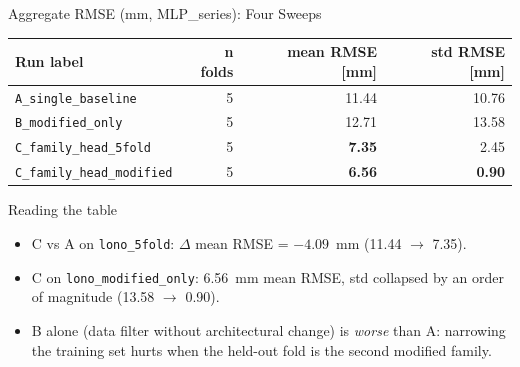 \documentclass[UTF8,aspectratio=169]{ctexbeamer}
\newcommand{\good}[1]{\textcolor{green!45!black}{#1}}
\begin{document}
\begin{frame}{Aggregate RMSE (mm, MLP\_series): Four Sweeps}
\small
\begin{center}
\renewcommand{\arraystretch}{1.22}
\setlength{\tabcolsep}{6pt}
\begin{tabular}{@{}lrrr@{}}
\toprule
\textbf{Run label} & \textbf{n folds} & \textbf{mean RMSE [mm]} & \textbf{std RMSE [mm]} \\
\midrule
\texttt{A\_single\_baseline}      & 5 & 11.44 & 10.76 \\
\texttt{B\_modified\_only}        & 5 & 12.71 & 13.58 \\
\rowcolor{winrow}
\texttt{C\_family\_head\_5fold}    & 5 & \textbf{7.35} & 2.45 \\
\rowcolor{winrow}
\texttt{C\_family\_head\_modified} & 5 & \textbf{6.56} & \textbf{0.90} \\
\bottomrule
\end{tabular}
\end{center}

\vspace{0.5em}
\begin{block}{Reading the table}
\begin{itemize}\setlength\itemsep{2pt}
  \item C vs A on \texttt{lono\_5fold}: $\Delta$ mean RMSE = \good{$-4.09$~mm}
        (11.44 $\to$ 7.35).
  \item C on \texttt{lono\_modified\_only}: \good{6.56~mm} mean RMSE,
        std collapsed by an order of magnitude (13.58 $\to$ 0.90).
  \item B alone (data filter without architectural change) is \emph{worse} than A:
        narrowing the training set hurts when the held-out fold is the
        second modified family.
\end{itemize}
\end{block}
\end{frame}
\end{document}
